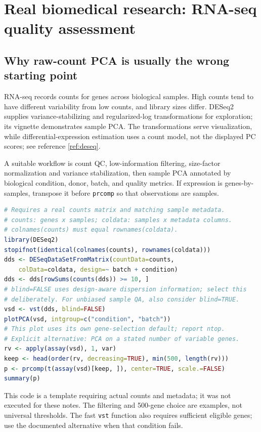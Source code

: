 \documentclass[11pt]{article}
\begin{document}
\section{Real biomedical research: RNA-seq quality assessment}
\subsection{Why raw-count PCA is usually the wrong starting point}
RNA-seq records counts for genes across biological samples. High counts tend to have different variability from low counts, and library sizes differ. DESeq2 supplies variance-stabilizing and regularized-log transformations for exploration; its vignette demonstrates sample PCA. The transformations serve visualization, while differential-expression estimation uses a count model, not the displayed PC scores; see reference \ref{ref:deseq}.

A suitable workflow is count QC, low-information filtering, size-factor normalization and variance stabilization, then sample PCA annotated by biological condition, donor, batch, and quality metrics. If expression is genes-by-samples, transpose it before \texttt{prcomp} so that observations are samples.

\begin{lstlisting}[language=R]
# Requires a real counts matrix and matching sample metadata.
# counts: genes x samples; coldata: samples x metadata columns.
# colnames(counts) must equal rownames(coldata).
library(DESeq2)
stopifnot(identical(colnames(counts), rownames(coldata)))
dds <- DESeqDataSetFromMatrix(countData=counts,
    colData=coldata, design=~ batch + condition)
dds <- dds[rowSums(counts(dds)) >= 10, ]
# blind=FALSE uses design-aware dispersion information; select this
# deliberately. For unbiased sample QA, also consider blind=TRUE.
vsd <- vst(dds, blind=FALSE)
plotPCA(vsd, intgroup=c("condition", "batch"))
# This plot uses its own gene-selection default; report ntop.
# Explicit alternative: PCA on a stated number of variable genes.
rv <- apply(assay(vsd), 1, var)
keep <- head(order(rv, decreasing=TRUE), min(500, length(rv)))
p <- prcomp(t(assay(vsd)[keep, ]), center=TRUE, scale.=FALSE)
summary(p)
\end{lstlisting}
This code is a template requiring actual counts and metadata; it was not executed for these notes. The filtering and 500-gene choice are examples, not universal thresholds. The fast \texttt{vst} function also requires sufficient eligible genes; use the documented alternative when that condition fails.
\end{document}
